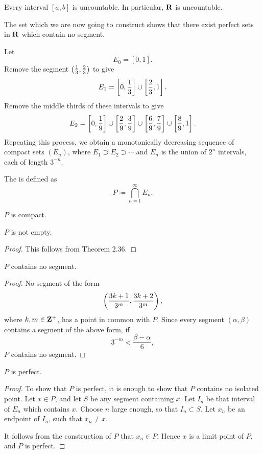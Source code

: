 \begin{corollary}
Every interval $[a,b]$ is uncountable. In particular, $\mathbf R$ is uncountable.
\end{corollary}

The set which we are now going to construct shows that there exist perfect sets in $\mathbf R$ which contain no segment.

Let
\[E_0=[0,1].\]
Remove the segment $\left(\frac{1}{3},\frac{2}{3}\right)$ to give
\[E_1=\left[0,\frac{1}{3}\right]\cup\left[\frac{2}{3},1\right].\]
Remove the middle thirds of these intervals to give
\[E_2=\left[0,\frac{1}{9}\right]\cup\left[\frac{2}{9},\frac{3}{9}\right]\cup\left[\frac{6}{9},\frac{7}{9}\right]\cup\left[\frac{8}{9},1\right].\]
Repeating this process, we obtain a monotonically decreasing sequence of compact sets $(E_n)$, where $E_1\supset E_2\supset\cdots$ and $E_n$ is the union of $2^n$ intervals, each of length $3^{-n}$.

The  is defined as
\[P\coloneqq\bigcap_{n=1}^{\infty}E_n.\]

\begin{proposition}
$P$ is compact.
\end{proposition}

\begin{proposition}
$P$ is not empty.
\end{proposition}

\begin{proof}
This follows from Theorem 2.36.
\end{proof}

\begin{proposition}
$P$ contains no segment.
\end{proposition}

\begin{proof}
No segment of the form
\[\left(\frac{3k+1}{3^m},\frac{3k+2}{3^m}\right),\]
where $k,m\in\mathbf Z^+$, has a point in common with $P$. Since every segment $(\alpha,\beta)$ contains a segment of the above form, if
\[3^{-m}<\frac{\beta-\alpha}{6},\]
$P$ contains no segment.
\end{proof}

\begin{proposition}
$P$ is perfect.
\end{proposition}

\begin{proof}
To show that $P$ is perfect, it is enough to show that $P$ contains no isolated point. Let $x\in P$, and let $S$ be any segment containing $x$. Let $I_n$ be that interval of $E_n$ which contains $x$. Choose $n$ large enough, so that $I_n\subset S$. Let $x_n$ be an endpoint of $I_n$, such that $x_n\neq x$.

It follows from the construction of $P$ that $x_n\in P$. Hence $x$ is a limit point of $P$, and $P$ is perfect.
\end{proof}
\pagebreak

